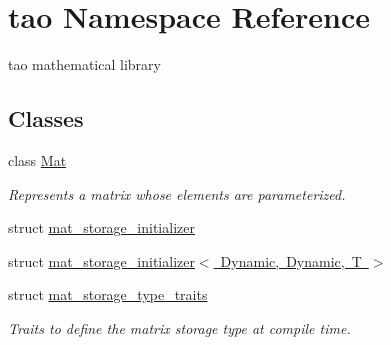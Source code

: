 \hypertarget{namespacetao}{}\section{tao Namespace Reference}
\label{namespacetao}


tao mathematical library  


\subsection*{Classes}
\begin{DoxyCompactItemize}
\item 
class \mbox{\hyperlink{classtao_1_1_mat}{Mat}}
\begin{DoxyCompactList}\small\item\em Represents a matrix whose elements are parameterized. \end{DoxyCompactList}\item 
struct \mbox{\hyperlink{structtao_1_1mat__storage__initializer}{mat\+\_\+storage\+\_\+initializer}}
\item 
struct \mbox{\hyperlink{structtao_1_1mat__storage__initializer_3_01_dynamic_00_01_dynamic_00_01_t_01_4}{mat\+\_\+storage\+\_\+initializer$<$ Dynamic, Dynamic, T $>$}}
\item 
struct \mbox{\hyperlink{structtao_1_1mat__storage__type__traits}{mat\+\_\+storage\+\_\+type\+\_\+traits}}
\begin{DoxyCompactList}\small\item\em Traits to define the matrix storage type at compile time. \end{DoxyCompactList}\end{DoxyCompactItemize}
